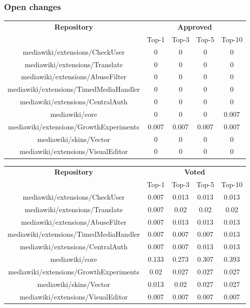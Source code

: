 \subsubsection{Open changes}
\begin{center}
\hspace{0.25cm}
\begin{tabular}{@{}c c c c c@{}} 
 \hline
    \textbf{Repository} &
    \multicolumn{4}{c}{\textbf{Approved}} \\
      & {Top-1} & {Top-3} & {Top-5} & {Top-10} \\
      \hline
mediawiki/extensions/CheckUser & 0 & 0 & 0 & 0 \\
mediawiki/extensions/Translate & 0 & 0 & 0 & 0 \\
mediawiki/extensions/AbuseFilter & 0 & 0 & 0 & 0 \\
mediawiki/extensions/TimedMediaHandler & 0 & 0 & 0 & 0 \\
mediawiki/extensions/CentralAuth & 0 & 0 & 0 & 0 \\
mediawiki/core & 0 & 0 & 0 & 0.007 \\
mediawiki/extensions/GrowthExperiments & 0.007 & 0.007 & 0.007 & 0.007 \\
mediawiki/skins/Vector & 0 & 0 & 0 & 0 \\
mediawiki/extensions/VisualEditor & 0 & 0 & 0 & 0 \\
\hline
\end{tabular}

\hspace{0.25cm}
\begin{tabular}{@{}c c c c c@{}} 
 \hline
    \textbf{Repository} &
    \multicolumn{4}{c}{\textbf{Voted}} \\
      & {Top-1} & {Top-3} & {Top-5} & {Top-10} \\
      \hline
mediawiki/extensions/CheckUser & 0.007 & 0.013 & 0.013 & 0.013 \\
mediawiki/extensions/Translate & 0.007 & 0.02 & 0.02 & 0.02 \\
mediawiki/extensions/AbuseFilter & 0.007 & 0.013 & 0.013 & 0.013 \\
mediawiki/extensions/TimedMediaHandler & 0.007 & 0.007 & 0.007 & 0.013 \\
mediawiki/extensions/CentralAuth & 0.007 & 0.007 & 0.013 & 0.013 \\
mediawiki/core & 0.133 & 0.273 & 0.307 & 0.393 \\
mediawiki/extensions/GrowthExperiments & 0.02 & 0.027 & 0.027 & 0.027 \\
mediawiki/skins/Vector & 0.013 & 0.02 & 0.027 & 0.027 \\
mediawiki/extensions/VisualEditor & 0.007 & 0.007 & 0.007 & 0.007 \\
\hline
\end{tabular}
\end{center}

